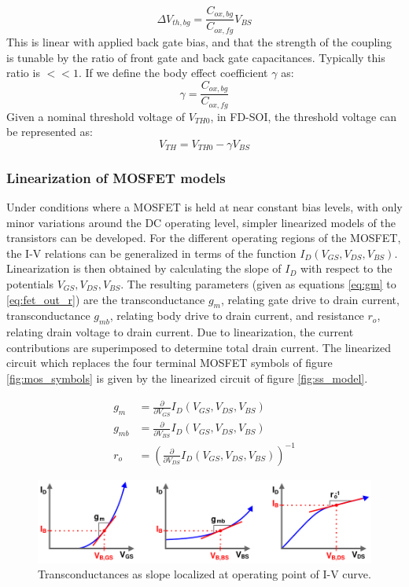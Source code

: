 	\begin{equation}
		\Delta V_{th,bg}= \frac{C_{ox,bg}}{C_{ox,fg}}V_{BS} 
	\end{equation}	
	This is linear with applied back gate bias, and that the strength of the coupling is tunable by the ratio of front gate and back gate capacitances. Typically this ratio is $<<1$. If we define the body effect coefficient $\gamma$ as:
	\begin{equation}
		\gamma = \frac{C_{ox,bg}}{C_{ox,fg}}
	\end{equation}
	Given a nominal threshold voltage of $V_{TH0}$, in FD-SOI, the threshold voltage can be represented as:
	\begin{equation}\label{eq:body_effect}
		V_{TH} = V_{TH0} - \gamma V_{BS}
	\end{equation}

	\subsubsection{Linearization of MOSFET models}
	Under conditions where a MOSFET is held at near constant bias levels, with only minor variations around the DC operating level, simpler linearized models of the transistors can be developed. For the different operating regions of the MOSFET, the I-V relations can be generalized in terms of the function $I_D(V_{GS}, V_{DS}, V_{BS})$. Linearization is then obtained by calculating the slope of $I_D$ with respect to the potentials $V_{GS}, V_{DS}, V_{BS}$. The resulting parameters (given as equations \ref{eq:gm} to \ref{eq:fet_out_r}) are the transconductance $g_m$, relating gate drive to drain current, transconductance $g_{mb}$, relating body drive to drain current, and resistance $r_o$, relating drain voltage to drain current. Due to linearization, the current contributions are superimposed to determine total drain current. The linearized circuit which replaces the four terminal MOSFET symbols of figure \ref{fig:mos_symbols} is given by the linearized circuit of figure \ref{fig:ss_model}.

	\begin{align}
		g_m & = \frac{\partial }{\partial V_{GS}}I_D(V_{GS}, V_{DS}, V_{BS}) \label{eq:gm}\\
		g_{mb} & = \frac{\partial }{\partial V_{BS}}I_D(V_{GS}, V_{DS}, V_{BS})\\
		r_o &= \left(\frac{\partial }{\partial V_{DS}}I_D(V_{GS}, V_{DS}, V_{BS})\right)^{-1}\label{eq:fet_out_r}
	\end{align}
		\begin{figure}[htb!]
		        \centering
		        \includegraphics[width=1\textwidth, angle=0]{./figs/theory/lin_oppoint}
		    \caption{Transconductances as slope localized at operating point of I-V curve.}
		    \label{fig:lin_oppoint}
		\end{figure}

